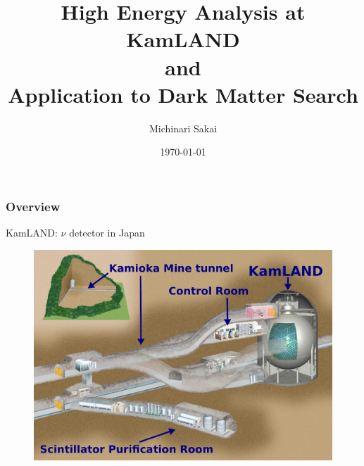 \documentclass[14pt]{beamer}
\title[KamLAND]{High Energy Analysis at KamLAND\\ and\\ Application to Dark
	Matter Search}
\author{Michinari Sakai} %
\institute[UH] %
{
University of Hawaii, Manoa \\ %
\medskip
\textit{michinar@hawaii.edu} %
}
\date{\today} %
\begin{document}
\begin{frame}
\titlepage %
\end{frame}

\begin{frame}
\frametitle{Overview} %
\tableofcontents %
\end{frame}




\begin{frame}[t]{KamLAND: $\nu$ detector in Japan}
	\centering
	\begin{figure}
		\includegraphics[width=\linewidth]{kamland_tunnel.pdf}
	\end{figure}
\end{frame}
\end{document}
